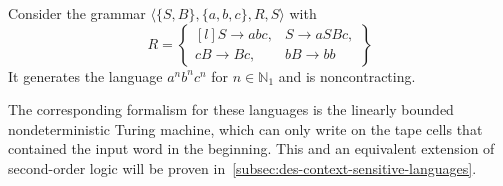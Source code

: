 \begin{exmp}
    Consider the grammar $\langle \{S, B\}, \{a, b, c\}, R, S \rangle$ with
    \[
        R = \begin{Bmatrix*}[l]
               S \to abc, &S \to aSBc, \\
               cB \to Bc, &bB \to bb
        \end{Bmatrix*}
    \]
    It generates the language $a^{n}b^{n}c^{n}$ for $n \in \mathbb{N}_{1}$ and is noncontracting.
\end{exmp}

The corresponding formalism for these languages is the linearly bounded nondeterministic Turing machine, which can only write on the tape cells that contained the input word in the beginning.
This and an equivalent extension of second-order logic will be proven in~\cref{subsec:des-context-sensitive-languages}.